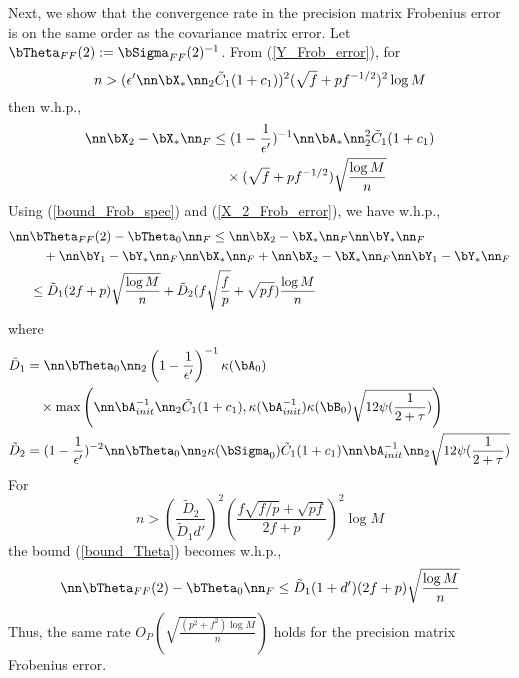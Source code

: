 \begin{IEEEproof}
Next, we show that the convergence rate in the precision matrix Frobenius error is on the same order as the covariance matrix error. Let $\bTheta_{FF}(2):=\bSigma_{FF}(2)^{-1}$. From (\ref{Y_Frob_error}), for
\begin{equation*}
	n> (\epsilon' \nn\bX_*\nn_2 \tilde{C}_1 (1+c_1))^2 (\sqrt{f}+pf^{-1/2})^2 \log M
\end{equation*}
then w.h.p.,
\begin{align}
	\nn \bX_2-\bX_*\nn_F &\leq (1-\frac{1}{\epsilon'})^{-1} \nn\bA_*\nn_2^2 \tilde{C}_1(1+c_1) \nonumber \\
		&\quad \times (\sqrt{f}+pf^{-1/2}) \sqrt{\frac{\log M}{n}} \label{X_2_Frob_error}
\end{align}
Using (\ref{bound_Frob_spec}) and (\ref{X_2_Frob_error}), we have w.h.p.,
\begin{align}
	\nn & \bTheta_{FF}(2)-\bTheta_0 \nn_F \leq \nn \bX_2-\bX_*\nn_F \nn \bY_*\nn_F \nonumber \\
		&\quad + \nn \bY_1-\bY_*\nn_F \nn \bX_*\nn_F + \nn \bX_2-\bX_*\nn_F \nn \bY_1-\bY_*\nn_F \nonumber \\
		&\leq \tilde{D}_1 (2f+p) \sqrt{\frac{\log M}{n}} + \tilde{D}_2 (f\sqrt{\frac{f}{p}}+\sqrt{pf}) \frac{\log M}{n} \label{bound_Theta}
\end{align}
where
\begin{align*}
	\tilde{D}_1 &= \nn\bTheta_0\nn_2 \left(1-\frac{1}{\epsilon'}\right)^{-1} \kappa(\bA_0) \\
	 &\quad \times \max\left(\nn\bA_{init}^{-1}\nn_2 \tilde{C}_1(1+c_1), \kappa(\bA_{init}^{-1}) \kappa(\bB_0) \sqrt{12 \psi(\frac{1}{2+\tau})} \right) \\
	\tilde{D}_2 &= (1-\frac{1}{\epsilon'})^{-2} \nn\bTheta_0\nn_2 \kappa(\bSigma_0) \tilde{C}_1 (1+c_1) \nn \bA_{init}^{-1}\nn_2 \sqrt{12 \psi(\frac{1}{2+\tau})}
\end{align*}
For
\begin{equation*}
	n>(\frac{\tilde{D}_2}{\tilde{D}_1 d'})^2 (\frac{f\sqrt{f/p}+\sqrt{pf}}{2f+p})^2 \log M
\end{equation*}
the bound (\ref{bound_Theta}) becomes w.h.p.,
\begin{equation*}
	\nn \bTheta_{FF}(2)-\bTheta_0 \nn_F \leq \tilde{D}_1 (1+d') (2f+p) \sqrt{\frac{\log M}{n}}
\end{equation*}
Thus, the same rate $O_P\left( \sqrt{\frac{(p^2+f^2)\log M}{n}} \right)$ holds for the precision matrix Frobenius error.




\end{IEEEproof}

